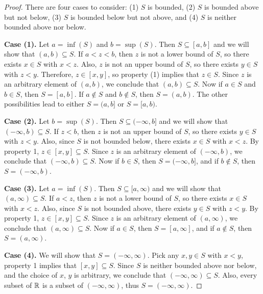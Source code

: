 \begin{proof}
  There are four cases to consider: (1) $S$ is bounded, (2) $S$ is
  bounded above but not below, (3) $S$ is bounded below but not
  above, and (4) $S$ is neither bounded above nor below.

  \textbf{Case (1).} Let $a = \inf(S)$ and $b = \sup(S)$. Then $S
  \subseteq [a, b]$ and we will show that $(a, b) \subseteq S$. If $a
  < z < b$, then $z$ is not a lower bound of $S$, so there exists $x
  \in S$ with $x < z$. Also, $z$ is not an upper bound of $S$, so
  there exists $y \in S$ with $z < y$. Therefore, $z \in [x, y]$, so
  property (1) implies that $z \in S$. Since $z$ is an arbitrary
  element of $(a, b)$, we conclude that $(a, b) \subseteq S$. Now if
  $a \in S$ and $b \in S$, then $S = [a, b]$. If $a \notin S$ and $b
  \notin S$, then $S = (a, b)$. The other possibilities lead to
  either $S = (a, b]$ or $S = [a, b)$.

  \textbf{Case (2).} Let $b = \sup(S)$. Then $S \subseteq (-\infty,
  b]$ and we will show that $(-\infty, b) \subseteq S$. If $z < b$,
  then $z$ is not an upper bound of $S$, so there exists $y \in S$
  with $z < y$. Also, since $S$ is not bounded below, there exists $x
  \in S$ with $x < z$. By property 1, $z \in [x, y] \subseteq S$.
  Since $z$ is an arbitrary element of $(-\infty, b)$, we conclude
  that $(-\infty, b) \subseteq S$. Now if $b \in S$, then $S =
  (-\infty, b]$, and if $b \notin S$, then $S = (-\infty, b)$.

  \textbf{Case (3).} Let $a = \inf(S)$. Then $S \subseteq [a,
  \infty)$ and we will show that $(a, \infty) \subseteq S$. If $a <
  z$, then $z$ is not a lower bound of $S$, so there exists $x \in S$
  with $x < z$. Also, since $S$ is not bounded above, there exists $y
  \in S$ with $z < y$. By property 1, $z \in [x, y] \subseteq S$.
  Since $z$ is an arbitrary element of $(a, \infty)$, we conclude
  that $(a, \infty) \subseteq S$. Now if $a \in S$, then $S = [a,
  \infty]$, and if $a \notin S$, then $S = (a, \infty)$.

  \textbf{Case (4).} We will show that $S = (-\infty, \infty)$. Pick
  any $x, y \in S$ with $x < y$, property 1 implies that $[x, y]
  \subseteq S$. Since $S$ is neither bounded above nor below, and the
  choice of $x$, $y$ is arbitrary, we conclude that $(-\infty,
  \infty) \subseteq S$. Also, every subset of $\mathbb R$ is a subset of
  $(-\infty, \infty)$, thus $S = (-\infty, \infty)$.
\end{proof}

